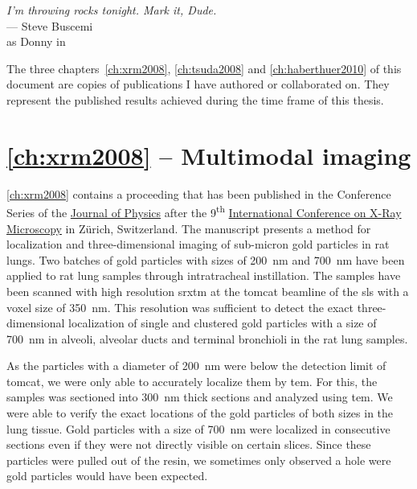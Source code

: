 \acresetall
{}\label{ch:publications}
\begin{flushright}{\slshape I'm throwing rocks tonight. Mark it, Dude.} \\ \medskip
	--- Steve Buscemi\\as Donny in \citep{TheBigLebowski}
\end{flushright}
\vspace{6cm}

The three chapters~\ref{ch:xrm2008}, \ref{ch:tsuda2008} and \ref{ch:haberthuer2010} of this document are copies of publications I have authored or collaborated on. They represent the published results achieved during the time frame of this thesis.

\section{\autoref{ch:xrm2008} -- Multimodal imaging}
\autoref{ch:xrm2008} contains a proceeding that has been published in the Conference Series of the \href{http://iopscience.iop.org/1742-6596/}{Journal of Physics} after the 9\textsuperscript{th} \href{http://xrm2008.web.psi.ch/}{International Conference on X-Ray Microscopy} in Zürich, Switzerland. The manuscript presents a method for localization and three-dimensional imaging of sub-micron gold particles in rat lungs. Two batches of gold particles with sizes of \SI{200}{\nano\meter} and \SI{700}{\nano\meter} have been applied to rat lung samples through intratracheal instillation. The samples have been scanned with high resolution \ac{srxtm} at the \ac{tomcat} beamline of the \ac{sls} with a voxel size of \SI{350}{\nano\meter}. This resolution was sufficient to detect the exact three-dimensional localization of single and clustered gold particles with a size of \SI{700}{\nano\meter} in alveoli, alveolar ducts and terminal bronchioli in the rat lung samples. 

As the particles with a diameter of \SI{200}{\nano\meter} were below the detection limit of \ac{tomcat}, we were only able to accurately localize them by \ac{tem}. For this, the samples was sectioned into \SI{300}{\nano\meter} thick sections and analyzed using \ac{tem}. We were able to verify the exact locations of the gold particles of both sizes in the lung tissue. Gold particles with a size of \SI{700}{\nano\meter} were localized in consecutive sections even if they were not directly visible on certain slices. Since these particles were pulled out of the resin, we sometimes only observed a hole were gold particles would have been expected.

